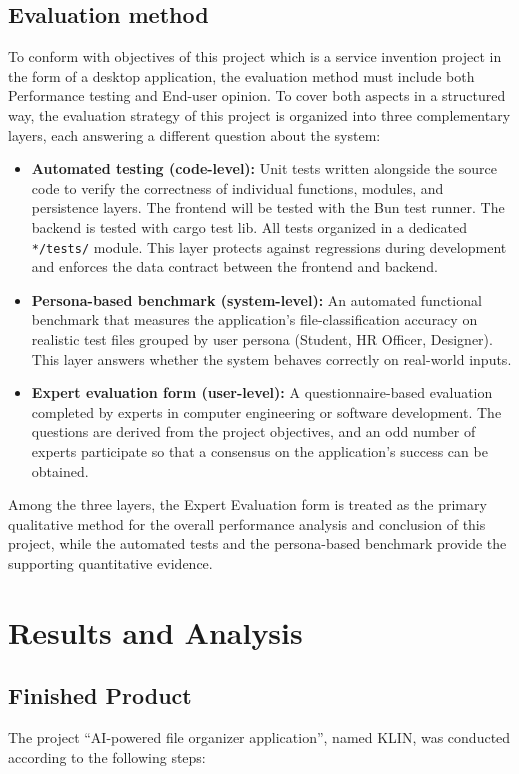 \documentclass[12pt,oneside,openright,a4paper]{cpe-english-project}
\begin{document}
\section{Evaluation method}
To conform with objectives of this project which is a service invention project in the form of a desktop application, the evaluation method must include both Performance testing and End-user opinion. To cover both aspects in a structured way, the evaluation strategy of this project is organized into three complementary layers, each answering a different question about the system:

\begin{itemize}
\item \textbf{Automated testing (code-level):} Unit tests written alongside the source code to verify the correctness of individual functions, modules, and persistence layers. The frontend will be tested with the Bun test runner. The backend is tested with cargo test lib. All tests organized in a dedicated \texttt{*/tests/} module. This layer protects against regressions during development and enforces the data contract between the frontend and backend.
\item \textbf{Persona-based benchmark (system-level):} An automated functional benchmark that measures the application's file-classification accuracy on realistic test files grouped by user persona (Student, HR Officer, Designer). This layer answers whether the system behaves correctly on real-world inputs.
\item \textbf{Expert evaluation form (user-level):} A questionnaire-based evaluation completed by experts in computer engineering or software development. The questions are derived from the project objectives, and an odd number of experts participate so that a consensus on the application's success can be obtained.
\end{itemize}
Among the three layers, the Expert Evaluation form is treated as the primary qualitative method for the overall performance analysis and conclusion of this project, while the automated tests and the persona-based benchmark provide the supporting quantitative evidence.

\chapter{Results and Analysis}
\section{Finished Product}
The project ``AI-powered file organizer application'', named KLIN, was conducted according to the following steps:
\end{document}
